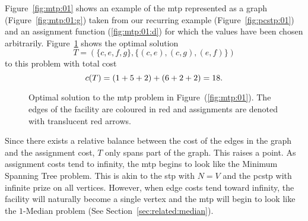 Figure~\ref{fig:mtp:01} shows an example of the \gls{mtp} represented as a graph
(Figure~\ref{fig:mtp:01:g}) taken from our recurring example (Figure~\ref{fig:pcstp:01})
and an assignment function (\ref{fig:mtp:01:d}) for which the values have been
chosen arbitrarily.
Figure~\ref{fig:mtp:01:opt}
shows the optimal solution
$$T = ( \{ c, e, f, g \}, \{(c, e), (c, g), (e, f)\})$$
to this problem with total cost
$$c(T) = (1 + 5 + 2) + (6 + 2 + 2) = 18\mathnormal{.}$$
\begin{figure}[h!]
  \centering
    \caption{Optimal solution to the \gls{mtp} problem in Figure~(\ref{fig:mtp:01}).
      The edges of the facility are coloured in red and assignments are denoted with translucent red arrows.}\label{fig:mtp:01:opt}
  \end{figure}

  Since there exists a relative balance between the cost of the edges in the graph and the assignment cost, $T$
  only spans part of the graph. This raises a point. As assignment costs tend to infinity, the \gls{mtp} begins to look
  like the Minimum Spanning Tree problem.
  This is akin to the \gls{stp} with $N = V$ and the \gls{pcstp} with infinite prize
  on all vertices. However, when edge costs tend toward infinity, the facility will naturally become a single vertex
  and the \gls{mtp} will begin to look like the $1$-Median problem (See Section~\ref{sec:related:median}).


